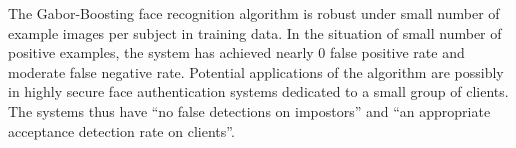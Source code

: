 \documentclass[a4paper,10pt]{article}
\begin{document}
The Gabor-Boosting face recognition algorithm is robust under small number of example images per subject in training data. In the situation of small number of positive examples, the system has achieved nearly $0$ false positive rate and moderate false negative rate. Potential applications of the algorithm are possibly in highly secure face authentication systems dedicated to a small group of clients. The systems thus have ``no false detections on impostors'' and ``an appropriate acceptance detection rate on clients''.
 


\end{document}

